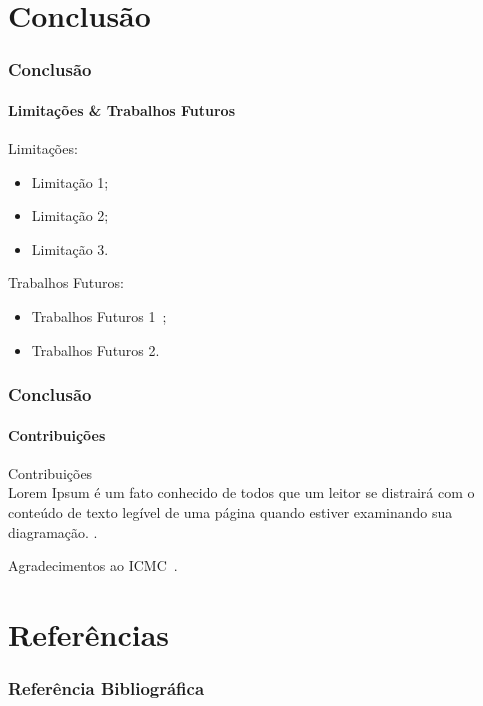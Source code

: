 \documentclass{beamer}
\begin{document}
    \section{Conclusão}
    
    \begin{frame}
      \frametitle{Conclusão}
      \framesubtitle{Limitações \& Trabalhos Futuros}
      
      Limitações:
      \begin{itemize}
        \item Limitação 1;
        \item Limitação 2;
        \item Limitação 3.
      \end{itemize}
      
      \bigskip
      
      Trabalhos Futuros:
      \begin{itemize}
        \item Trabalhos Futuros 1~\cite{knuth-fa};
        \item Trabalhos Futuros 2.
      \end{itemize}
    \end{frame}
    
    
    \begin{frame}
      \frametitle{Conclusão}
      \framesubtitle{Contribuições}
        Contribuições\\
        Lorem Ipsum é um fato conhecido de todos que um leitor se distrairá com o conteúdo de texto legível de uma página quando estiver examinando sua diagramação.
        \cite{latexcompanion}.
        
        Agradecimentos ao ICMC~\cite{icmc}.
    \end{frame}
    
    \section{Referências}
    
    \begin{frame}[allowframebreaks]
      \frametitle{Referência Bibliográfica}
      
      
      
    \end{frame}
    
    
    
\end{document}
